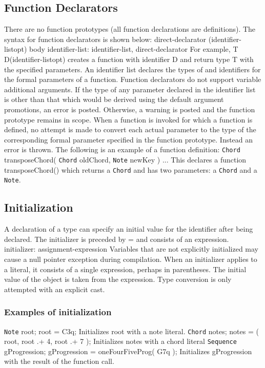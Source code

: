 \documentclass[12pt,A4]{book}
\begin{document}
\subsection{Function Declarators}
There are no function prototypes (all function declarations are definitions).  The syntax for function declarators is shown below:
direct-declarator (identifier-listopt) { body }
identifier-list:
identifier-list, direct-declarator
For example,
T D(identifier-listopt)
creates a function with identifier D and return type T with the specified parameters. An identifier list declares the types of and identifiers for the formal parameters of a function.
Function declarators do not support variable additional arguments.  
If the type of any parameter declared in the identifier list is other than that which would be derived using the default argument promotions, an error is posted.  Otherwise, a warning is posted and the function prototype remains in scope.
When a function is invoked for which a function is defined, no attempt is made to convert each actual parameter to the type of the corresponding formal parameter specified in the function prototype. Instead an error is thrown.  
The following is an example of a function definition:
\verb|Chord| transposeChord( \verb|Chord| oldChord, \verb|Note| newKey ) { ... }
This declares a function transposeChord() which returns a \verb|Chord| and has two parameters: a \verb|Chord| and a \verb|Note|.  
\subsection{Initialization}
A declaration of a type can specify an initial value for the identifier after being declared.  The initializer is preceded by = and consists of an expression.
initializer:    assignment-expression
Variables that are not explicitly initialized may cause a null pointer exception during compilation. When an initializer applies to a literal, it consists of a single expression, perhaps in parentheses.  The initial value of the object is taken from the expression.  Type conversion is only attempted with an explicit cast.
\subsubsection{Examples of initialization}
\verb|Note| root;
root = C3q;
Initializes root with a note literal.
\verb|Chord| notes;
notes = ( root, root .+ 4, root .+ 7 );
Initializes notes with a chord literal
\verb|Sequence| gProgression;
gProgression = oneFourFiveProg( G7q );
Initializes gProgression with the result of the function call.
\end{document}
